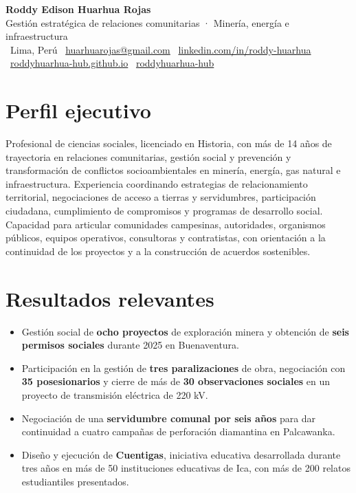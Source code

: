 \documentclass[10pt,a4paper]{article}
\begin{document}
{\fontsize{24}{28}\selectfont\bfseries Roddy Edison Huarhua Rojas}\\[3pt]
{\large\color{teal} Gestión estratégica de relaciones comunitarias · Minería, energía e infraestructura}\\[6pt]
{\small\color{muted}
\faMapMarker*\ Lima, Perú \quad
\faEnvelope\ \href{mailto:huarhuarojas@gmail.com}{huarhuarojas@gmail.com} \quad
\faLinkedin\ \href{https://www.linkedin.com/in/roddy-huarhua/}{linkedin.com/in/roddy-huarhua}\\[2pt]
\faGlobe\ \href{https://roddyhuarhua-hub.github.io}{roddyhuarhua-hub.github.io} \quad
\faGithub\ \href{https://github.com/roddyhuarhua-hub}{roddyhuarhua-hub}}

\section{Perfil ejecutivo}
Profesional de ciencias sociales, licenciado en Historia, con más de 14 años de trayectoria en relaciones comunitarias, gestión social y prevención y transformación de conflictos socioambientales en minería, energía, gas natural e infraestructura. Experiencia coordinando estrategias de relacionamiento territorial, negociaciones de acceso a tierras y servidumbres, participación ciudadana, cumplimiento de compromisos y programas de desarrollo social. Capacidad para articular comunidades campesinas, autoridades, organismos públicos, equipos operativos, consultoras y contratistas, con orientación a la continuidad de los proyectos y a la construcción de acuerdos sostenibles.

\section{Resultados relevantes}
\begin{itemize}
  \item Gestión social de \textbf{ocho proyectos} de exploración minera y obtención de \textbf{seis permisos sociales} durante 2025 en Buenaventura.
  \item Participación en la gestión de \textbf{tres paralizaciones} de obra, negociación con \textbf{35 posesionarios} y cierre de más de \textbf{30 observaciones sociales} en un proyecto de transmisión eléctrica de 220 kV.
  \item Negociación de una \textbf{servidumbre comunal por seis años} para dar continuidad a cuatro campañas de perforación diamantina en Palcawanka.
  \item Diseño y ejecución de \textbf{Cuentigas}, iniciativa educativa desarrollada durante tres años en más de 50 instituciones educativas de Ica, con más de 200 relatos estudiantiles presentados.
\end{itemize}
\end{document}
